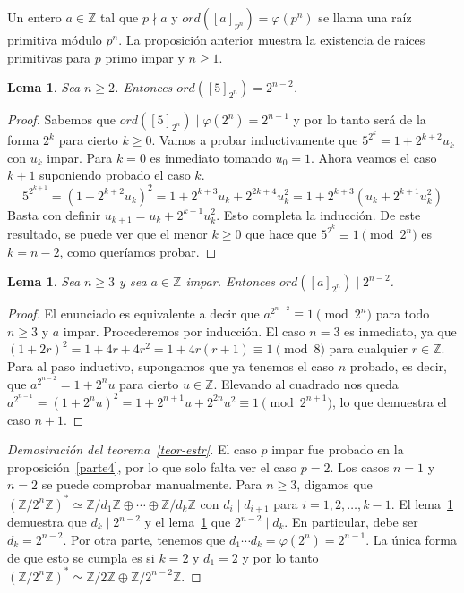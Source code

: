 \documentclass[a4paper, 11pt]{article}
\newcommand{\ZZ}{\mathbb{Z}}
\theoremstyle{plain}
\newtheorem{lema}[teor]{Lema}
\theoremstyle{definition}
\begin{document}
Un entero $a\in\ZZ$ tal que $p\nmid a$ y $ord([a]_{p^n})=\varphi(p^n)$ se
llama una raíz primitiva módulo $p^n$. La proposición anterior muestra la
existencia de raíces primitivas para $p$ primo impar y $n\geq 1$.

\begin{lema}\label{parte5}
Sea $n\geq 2$. Entonces $ord([5]_{2^n})=2^{n-2}$.
\end{lema}
\begin{proof}
Sabemos que $ord([5]_{2^n})\mid\varphi(2^n)=2^{n-1}$ y por lo tanto será de
la forma $2^k$ para cierto $k\geq 0$. Vamos a probar inductivamente que
$5^{2^k}=1+2^{k+2}u_k$ con $u_k$ impar. Para $k=0$ es inmediato tomando
$u_0=1$. Ahora veamos el caso $k+1$ suponiendo probado el caso $k$.
\[
  5^{2^{k+1}}=(1+2^{k+2}u_k)^2=1+2^{k+3}u_k+2^{2k+4}u_k^2=
  1+2^{k+3}(u_k+2^{k+1}u_k^2)
\]
Basta con definir $u_{k+1}=u_k+2^{k+1}u_k^2$. Esto completa la inducción.
De este resultado, se puede ver que el menor $k\geq 0$ que hace que $5^{2^k}\equiv1
\pmod{2^n}$ es $k=n-2$, como queríamos probar.
\end{proof}

\begin{lema}\label{parte6}
Sea $n\geq 3$ y sea $a\in\ZZ$ impar. Entonces $ord([a]_{2^n})\mid 2^{n-2}$.
\end{lema}
\begin{proof}
El enunciado es equivalente a decir que $a^{2^{n-2}}\equiv1\pmod{2^n}$ para
todo $n\geq 3$ y $a$ impar. Procederemos por inducción. El caso $n=3$ es
inmediato, ya que $(1+2r)^2=1+4r+4r^2=1+4r(r+1)\equiv 1\pmod{8}$ para
cualquier $r\in\ZZ$. Para al paso inductivo, supongamos que ya tenemos el caso
$n$ probado, es decir, que $a^{2^{n-2}}=1+2^nu$ para cierto $u\in\ZZ$. Elevando
al cuadrado nos queda
$a^{2^{n-1}}=(1+2^nu)^2=1+2^{n+1}u+2^{2n}u^2\equiv1\pmod{2^{n+1}}$, lo
que demuestra el caso $n+1$.
\end{proof}

\begin{proof}[Demostración del teorema~\ref{teor-estr}]
El caso $p$ impar fue probado en la proposición~\ref{parte4}, por lo que solo
falta ver el caso $p=2$. Los casos $n=1$ y $n=2$ se puede comprobar manualmente.
Para $n\geq 3$, digamos que $(\ZZ/2^n\ZZ)^*\simeq\ZZ/d_1\ZZ\oplus\cdots\oplus
\ZZ/d_k\ZZ$ con $d_i\mid d_{i+1}$ para $i=1,2,\ldots,k-1$. El lema~\ref{parte6}
demuestra que $d_k\mid 2^{n-2}$ y el lema~\ref{parte5} que $2^{n-2}\mid d_k$.
En particular, debe ser $d_k=2^{n-2}$. Por otra parte, tenemos que $d_1\cdots
d_k=\varphi(2^n)=2^{n-1}$. La única forma de que esto se cumpla es si $k=2$
y $d_1=2$ y por lo tanto $(\ZZ/2^n\ZZ)^*\simeq\ZZ/2\ZZ\oplus\ZZ/2^{n-2}\ZZ$.
\end{proof}
\end{document}
